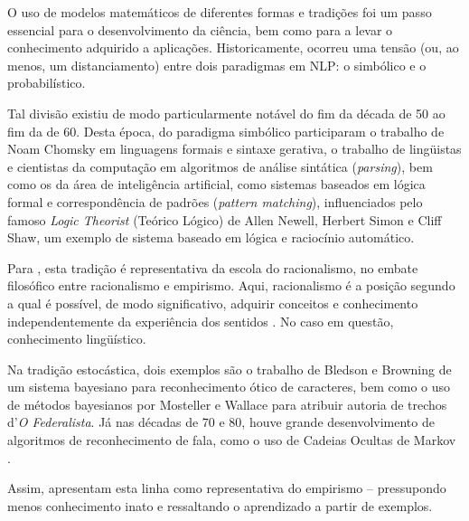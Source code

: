 	
	O uso de modelos matemáticos de diferentes formas e tradições foi um passo essencial para o desenvolvimento da ciência, bem como para a levar o conhecimento adquirido a aplicações. Historicamente, ocorreu uma tensão (ou, ao menos, um distanciamento) entre dois paradigmas em NLP: o simbólico e o probabilístico. 
	
		Tal divisão existiu de modo particularmente notável do fim da década de 50 ao fim da de 60. Desta época, do paradigma simbólico participaram o trabalho de Noam Chomsky em linguagens formais e sintaxe gerativa, o trabalho de lingüistas e cientistas da computação em algoritmos de análise sintática (\textit{parsing}), bem como os da área de inteligência artificial, como sistemas baseados em lógica formal e correspondência de padrões (\textit{pattern matching}), influenciados pelo famoso \textit{Logic Theorist} (Teórico Lógico) de Allen Newell, Herbert Simon e Cliff Shaw, um exemplo de sistema baseado em lógica e raciocínio automático.
		
		Para \citet[pp.~4--7]{Manning:1999}, esta tradição é representativa da escola do racionalismo, no embate filosófico entre racionalismo e empirismo. Aqui, racionalismo é a posição segundo a qual é possível, de modo significativo, adquirir conceitos e conhecimento independentemente da experiência dos sentidos \citep{sep-rationalism-empiricism}. No caso em questão, conhecimento lingüístico.
%
	
		Na tradição estocástica, dois exemplos são o trabalho de Bledson e Browning de um sistema bayesiano para reconhecimento ótico de caracteres, bem como o uso de métodos bayesianos por Mosteller e Wallace para atribuir autoria de trechos d'\textit{O Federalista}. Já nas décadas de 70 e 80, houve grande desenvolvimento de algoritmos de reconhecimento de fala, como o uso de Cadeias Ocultas de Markov \citep[pp.10--11]{Jurafsky:2009}.
		
		Assim, \citet[pp.~4--7]{Manning:1999} apresentam esta linha como representativa do empirismo -- pressupondo menos conhecimento inato e ressaltando o aprendizado a partir de exemplos.
	
		
